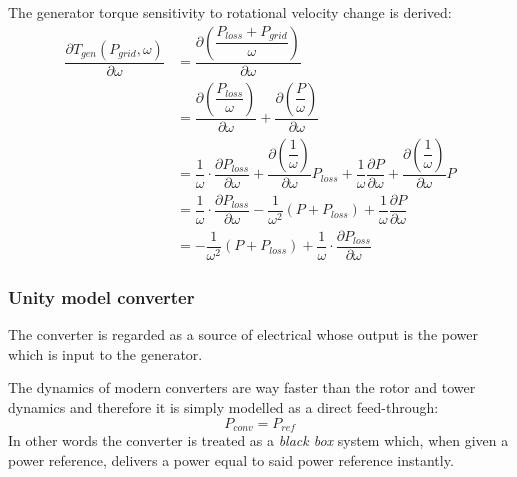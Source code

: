 The generator torque sensitivity to rotational velocity change is derived:
\begin{align}
	\dfrac{\partial T_{gen}(P_{grid}, \omega)}{\partial \omega} & = \dfrac{\partial \left (\dfrac{P_{loss} +  P_{grid}}{\omega}\right )}{\partial \omega} \\
	& = \dfrac{\partial \left (\dfrac{P_{loss}}{\omega} \right )}{\partial \omega} + \dfrac{\partial \left (\dfrac{P}{\omega} \right )}{\partial \omega} \\
	& = \dfrac{1}{\omega} \cdot \dfrac{\partial P_{loss}}{\partial \omega} + \dfrac{\partial \left (\dfrac{1}{\omega} \right)}{\partial \omega} P_{loss} + \dfrac{1}{\omega} \dfrac{\partial P}{\partial \omega} + \dfrac{\partial \left (\dfrac{1}{\omega} \right )}{\partial \omega} P \\
	& = \dfrac{1}{\omega} \cdot  \dfrac{\partial P_{loss}}{\partial \omega} - \dfrac{1}{\omega^2}(P + P_{loss}) + \dfrac{1}{\omega} \dfrac{\partial P}{\partial \omega} \\
	& = -\dfrac{1}{\omega^2}(P + P_{loss}) + \dfrac{1}{\omega} \cdot \dfrac{\partial P_{loss}}{\partial \omega}
\end{align}


\subsubsection{Unity model converter}
The converter is regarded as a source of electrical whose output is the power which is input to the generator.

The dynamics of modern converters are way faster than the rotor and tower dynamics and therefore it is simply modelled as a direct feed-through:
\begin{equation}\label{eq:wtLin_comp_convdft}
	P_{conv} = P_{ref}
\end{equation}
In other words the converter is treated as a \textit{black box} system which, when given a power reference, delivers a power equal to said power reference instantly.



%	


